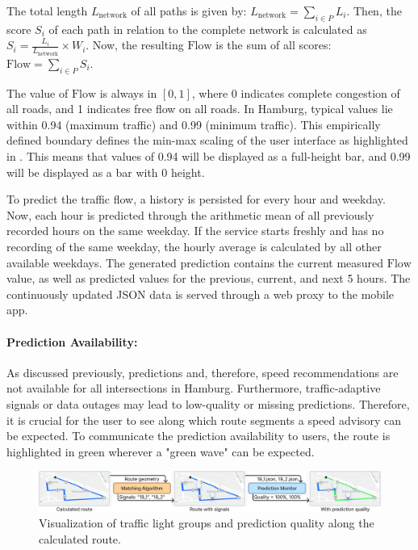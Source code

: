 The total length $L_\text{network}$ of all paths is given by: $L_\text{network} = \sum_{i \in P} L_i$. Then, the score $S_i$ of each path in relation to the complete network is calculated as $S_i = \frac{L_i}{L_\text{network}} \times W_i$. Now, the resulting $\text{Flow}$ is the sum of all scores: $\text{Flow} = \sum_{i \in P} S_i$. 

The value of $\text{Flow}$ is always in $[0, 1]$, where 0 indicates complete congestion of all roads, and 1 indicates free flow on all roads. In Hamburg, typical values lie within 0.94 (maximum traffic) and 0.99 (minimum traffic). This empirically defined boundary defines the min-max scaling of the user interface as highlighted in . This means that values of 0.94 will be displayed as a full-height bar, and 0.99 will be displayed as a bar with 0 height. 

To predict the traffic flow, a history is persisted for every hour and weekday. Now, each hour is predicted through the arithmetic mean of all previously recorded hours on the same weekday. If the service starts freshly and has no recording of the same weekday, the hourly average is calculated by all other available weekdays. The generated prediction contains the current measured $\text{Flow}$ value, as well as predicted values for the previous, current, and next 5 hours. The continuously updated JSON data is served through a web proxy to the mobile app.

\paragraph{Prediction Availability:} As discussed previously, predictions and, therefore, speed recommendations are not available for all intersections in Hamburg. Furthermore, traffic-adaptive signals or data outages may lead to low-quality or missing predictions. Therefore, it is crucial for the user to see along which route segments a speed advisory can be expected. To communicate the prediction availability to users, the route is highlighted in green wherever a "green wave" can be expected.

\begin{figure}[htbp]
\centering
\includegraphics[width=\linewidth]{images/routing-process-quality-mapping.png}
\caption{Visualization of traffic light groups and prediction quality along the calculated route.}
\label{fig:routing-process-quality-mapping}
\end{figure}

